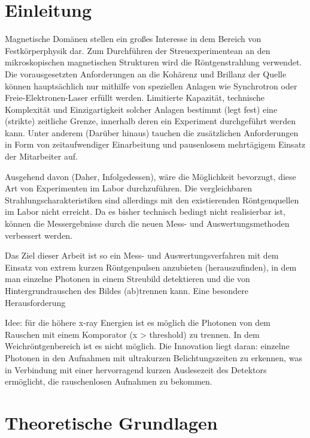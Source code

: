\chapter{Einleitung}
Magnetische Domänen stellen ein großes Interesse in dem Bereich von Festkörperphysik dar. Zum Durchführen der Streuexperimentean an den mikroskopischen magnetischen Strukturen wird die Röntgenstrahlung verwendet. Die vorausgesetzten Anforderungen an die Kohärenz und Brillanz der Quelle können hauptsächlich nur mithilfe von speziellen Anlagen wie Synchrotron oder Freie-Elektronen-Laser erfüllt werden. Limitierte Kapazität, technische Komplexität und Einzigartigkeit solcher Anlagen bestimmt (legt fest) eine (strikte) zeitliche Grenze, innerhalb deren ein Experiment durchgeführt werden kann. Unter anderem (Darüber hinaus) tauchen die zusätzlichen Anforderungen in Form von zeitaufwendiger Einarbeitung und pausenlosem mehrtägigem Einsatz der Mitarbeiter auf.

Ausgehend davon (Daher, Infolgedessen), wäre die Möglichkeit bevorzugt, diese Art von Experimenten im Labor durchzuführen. Die vergleichbaren Strahlungscharakteristiken  sind allerdings mit den existierenden Röntgenquellen im Labor nicht erreicht. Da es bisher technisch bedingt nicht realisierbar ist, können die Messergebnisse durch die neuen Mess- und Auswertungsmethoden verbessert werden.  

Das Ziel dieser Arbeit ist so ein  Mess- und Auswertungsverfahren mit dem Einsatz von extrem kurzen Röntgenpulsen anzubieten (herauszufinden), in dem man einzelne Photonen in einem Streubild detektieren und die von Hintergrundrauschen des Bildes (ab)trennen kann. Eine besondere Herausforderung  



Idee: für die höhere x-ray Energien ist es möglich die Photonen von dem Rauschen mit einem Komporator (x > threshold) zu trennen. In dem Weichröntgenbereich ist es nicht möglich. Die Innovation liegt daran:  einzelne Photonen in den Aufnahmen mit ultrakurzen Belichtungszeiten zu erkennen, was in Verbindung mit einer hervorragend kurzen Auslesezeit des Detektors ermöglicht, die rauschenlosen Aufnahmen zu bekommen.
\chapter{Theoretische Grundlagen}

